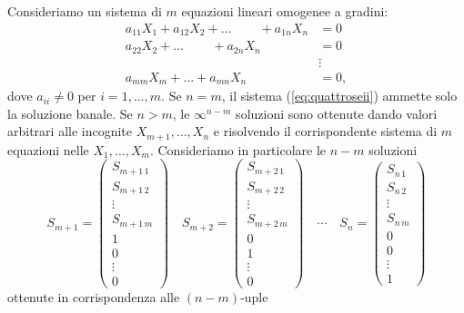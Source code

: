 \documentclass{article}
\theoremstyle{plain}
\theoremstyle{definition}
\theoremstyle{remark}
\begin{document}
Consideriamo un sistema di \( m \) equazioni lineari omogenee a gradini:
\begin{equation}
    \begin{aligned}\label{eq:quattroseii}
    a_{11}X_1 + a_{12}X_2 + \ldots\quad\,\quad + a_{1n}X_n &= 0 \\
    a_{22}X_2 + \ldots \quad\,\quad+ a_{2n}X_n &= 0 \\
    &\vdots \\
    a_{mm}X_m + \ldots + a_{mn}X_n &= 0,
    \end{aligned}
\end{equation}
dove \( a_{ii} \neq 0 \) per \( i = 1, \ldots, m \). 
Se \( n = m \), il sistema (\ref{eq:quattroseii}) ammette solo la soluzione banale. 
Se \( n > m \), le \( \infty^{n-m} \) soluzioni sono ottenute dando valori arbitrari alle incognite \( X_{m+1}, \ldots, X_n \) 
e risolvendo il corrispondente sistema di \( m \) equazioni nelle \( X_1, \ldots, X_m \). 
Consideriamo in particolare le \( n - m \) soluzioni
\[
S_{m+1}=
\begin{pmatrix}
    S_{m+1\,1}\\
    S_{m+1\,2}\\
    \vdots\\
    S_{m+1\,m}\\
    1\\
    0\\
    \vdots\\
    0
\end{pmatrix}
\quad
S_{m+2}=
\begin{pmatrix}
    S_{m+2\,1}\\
    S_{m+2\,2}\\
    \vdots\\
    S_{m+2\,m}\\
    0\\
    1\\
    \vdots\\
    0
\end{pmatrix}
\quad
\cdots
\quad 
S_n=
\begin{pmatrix}
    S_{n\,1}\\
    S_{n\,2}\\
    \vdots\\
    S_{n\,m}\\
    0\\
    0\\
    \vdots\\
    1
\end{pmatrix}
\]
ottenute in corrispondenza alle \( (n - m) \)-uple
\end{document}
